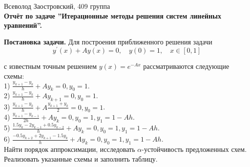 \documentclass[14pt,a4paper]{extarticle}
\newcommand{\1}{\mathbbm{1}}
\begin{document}
\begin{center}

    {Всеволод Заостровский, 409 группа}\\
    {\bfseries Отчёт по задаче ''Итерационные методы решения систем линейных уравнений''.\\}
    \vspace{1cm}

\end{center}

\textbf{Постановка задачи.} Для построения приближенного решения задачи
$$
y^{\prime}(x)+A y(x)=0, \quad y(0)=1, \quad x \in[0,1]
$$

с известным точным решением $y(x)=e^{-A x}$ рассматриваются следующие схемы: \\
1) $\frac{y_{k+1}-y_k}{h}+A y_k=0, y_0=1$. \\
2) $\frac{y_{k+1}-y_k}{h}+A y_{k+1}=0, y_0=1$.\\
3) $\frac{y_{k+1}-y_k}{h}+A \frac{y_{k+1}+y_k}{2}=0, y_0=1$. \\
4) $\frac{y_{k+1}-y_{k-1}}{2 h}+A y_k=0, y_0=1, y_1=1-A h$.\\
5) $\frac{1.5 y_k-2 y_{k-1}+0.5 y_{k-2}}{h}+A y_k=0, y_0=1, y_1=1-A h$.\\
6) $\frac{-0.5 y_{k+2}+2 y_{k+1}-1.5 y_k}{h}+A y_k=0, y_0=1, y_1=1-A h$.\\

Найти порядок аппроксимации, исследовать $\alpha$-устойчивость предложенных схем. Реализовать указанные схемы и заполнить таблицу.
\end{document}

